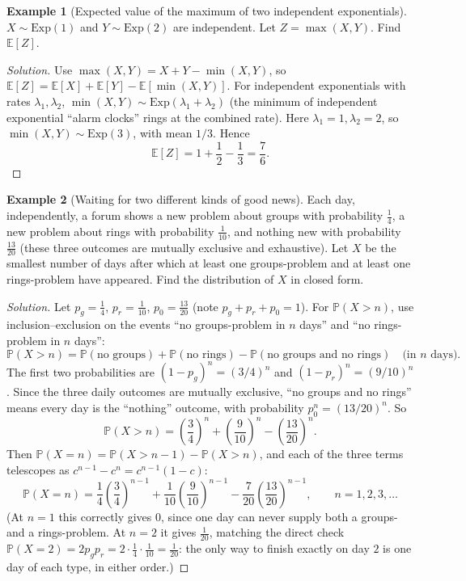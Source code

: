 \documentclass[11pt]{article}
\theoremstyle{definition}
\newtheorem{example}{Example}[section]
\newcommand{\E}{\mathbb{E}}
\begin{document}
\begin{example}[Expected value of the maximum of two independent exponentials]
$X\sim\mathrm{Exp}(1)$ and $Y\sim\mathrm{Exp}(2)$ are independent. Let $Z=\max(X,Y)$. Find $\E[Z]$.
\end{example}

\begin{proof}[Solution]
Use $\max(X,Y)=X+Y-\min(X,Y)$, so $\E[Z]=\E[X]+\E[Y]-\E[\min(X,Y)]$. For independent exponentials with rates $\lambda_1,\lambda_2$, $\min(X,Y)\sim\mathrm{Exp}(\lambda_1+\lambda_2)$ (the minimum of independent exponential ``alarm clocks'' rings at the combined rate). Here $\lambda_1=1,\lambda_2=2$, so $\min(X,Y)\sim\mathrm{Exp}(3)$, with mean $1/3$. Hence
\[
\E[Z]=1+\frac12-\frac13=\boxed{\frac{7}{6}}.
\]
\end{proof}

\begin{example}[Waiting for two different kinds of good news]
Each day, independently, a forum shows a new problem about groups with probability $\tfrac14$, a new problem about rings with probability $\tfrac1{10}$, and nothing new with probability $\tfrac{13}{20}$ (these three outcomes are mutually exclusive and exhaustive). Let $X$ be the smallest number of days after which at least one groups-problem and at least one rings-problem have appeared. Find the distribution of $X$ in closed form.
\end{example}

\begin{proof}[Solution]
Let $p_g=\tfrac14$, $p_r=\tfrac1{10}$, $p_0=\tfrac{13}{20}$ (note $p_g+p_r+p_0=1$). For $\mathbb{P}(X>n)$, use inclusion–exclusion on the events ``no groups-problem in $n$ days'' and ``no rings-problem in $n$ days'':
\[
\mathbb{P}(X>n)=\mathbb{P}(\text{no groups})+\mathbb{P}(\text{no rings})-\mathbb{P}(\text{no groups and no rings}) \quad \text{(in $n$ days)}.
\]
The first two probabilities are $(1-p_g)^n=(3/4)^n$ and $(1-p_r)^n=(9/10)^n$. Since the three daily outcomes are mutually exclusive, ``no groups and no rings'' means every day is the ``nothing'' outcome, with probability $p_0^n=(13/20)^n$. So
\[
\mathbb{P}(X>n)=\left(\frac34\right)^n+\left(\frac9{10}\right)^n-\left(\frac{13}{20}\right)^n.
\]
Then $\mathbb{P}(X=n)=\mathbb{P}(X>n-1)-\mathbb{P}(X>n)$, and each of the three terms telescopes as $c^{n-1}-c^n=c^{n-1}(1-c)$:
\[
\boxed{\mathbb{P}(X=n)=\frac14\left(\frac34\right)^{n-1}+\frac1{10}\left(\frac9{10}\right)^{n-1}-\frac{7}{20}\left(\frac{13}{20}\right)^{n-1}}, \qquad n=1,2,3,\dots
\]
(At $n=1$ this correctly gives $0$, since one day can never supply both a groups- and a rings-problem. At $n=2$ it gives $\tfrac1{20}$, matching the direct check $\mathbb P(X=2)=2p_gp_r=2\cdot\tfrac14\cdot\tfrac1{10}=\tfrac1{20}$: the only way to finish exactly on day $2$ is one day of each type, in either order.)
\end{proof}
\end{document}
